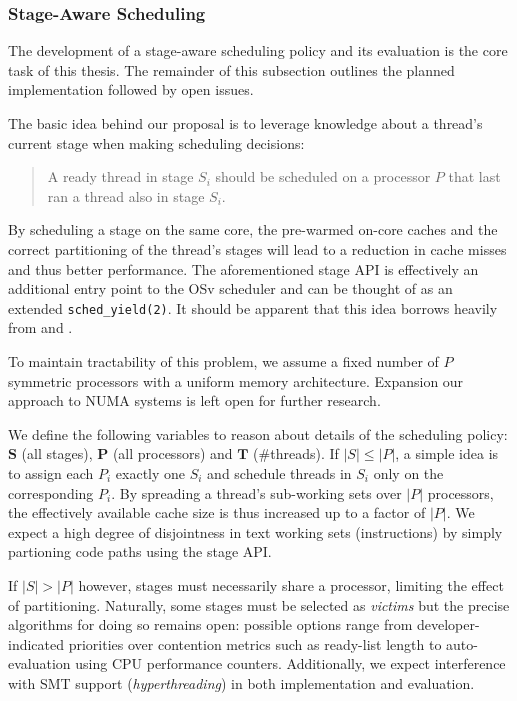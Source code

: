 \documentclass{article}
\begin{document}
\subsubsection{Stage-Aware Scheduling}\label{stageawaresched}

The development of a stage-aware scheduling policy and its evaluation is the core task of this thesis.
The remainder of this subsection outlines the planned implementation followed by open issues.

The basic idea behind our proposal is to leverage knowledge about a thread's current stage when making scheduling decisions:
\begin{quote} %
A ready thread in stage $S_i$ should be scheduled on a processor $P$ that last ran a thread also in stage $S_i$.
\end{quote}

By scheduling a stage on the same core, the pre-warmed on-core caches and the correct partitioning of the thread's stages
will lead to a reduction in cache misses and thus better performance.
The aforementioned stage API is effectively an additional entry point to the OSv scheduler and can be thought of as an
extended \texttt{sched\_yield(2)}.
It should be apparent that this idea borrows heavily from \cite{sodaspr,cohort} and \cite{gottschlag2017}.

To maintain tractability of this problem, we assume a fixed number of $P$ symmetric processors with a uniform memory architecture.
Expansion our approach to NUMA systems is left open for further research.

We define the following variables to reason about details of the scheduling policy:
{$\mathbf{S}$} (all stages), $\mathbf{P}$ (all processors) and $\mathbf{T}$ (\#threads).
If $|S| \le |P|$, a simple idea is to assign each $P_i$ exactly one $S_i$ and schedule threads in $S_i$ only on the corresponding $P_i$.
By spreading a thread's sub-working sets over $|P|$ processors, the effectively available cache size is thus increased up to a factor
of $|P|$. We expect a high degree of disjointness in text working sets (instructions) by simply partioning code paths
using the stage API.

If $|S| > |P|$ however, stages must necessarily share a processor, limiting the effect of partitioning.
Naturally, some stages must be selected as \textit{victims} but the precise algorithms for doing so remains open:
possible options range from developer-indicated priorities over contention metrics such as ready-list length
to auto-evaluation using CPU performance counters.
Additionally, we expect interference with SMT support (\textit{hyperthreading}) in both implementation and evaluation.
\end{document}
